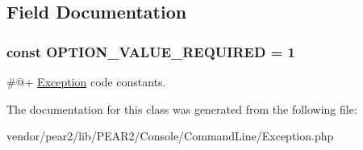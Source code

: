 \subsection{\-Field \-Documentation}
\hypertarget{class_p_e_a_r2_1_1_console_1_1_command_line_1_1_exception_a6c8de7ca8e71c28392907f2b23d6ed76}{
\subsubsection[{\-O\-P\-T\-I\-O\-N\-\_\-\-V\-A\-L\-U\-E\-\_\-\-R\-E\-Q\-U\-I\-R\-E\-D}]{\setlength{\rightskip}{0pt plus 5cm}const \-O\-P\-T\-I\-O\-N\-\_\-\-V\-A\-L\-U\-E\-\_\-\-R\-E\-Q\-U\-I\-R\-E\-D = 1}}
\label{class_p_e_a_r2_1_1_console_1_1_command_line_1_1_exception_a6c8de7ca8e71c28392907f2b23d6ed76}
\#@+ \hyperlink{class_p_e_a_r2_1_1_console_1_1_command_line_1_1_exception}{\-Exception} code constants. 

\-The documentation for this class was generated from the following file\-:\begin{DoxyCompactItemize}
\item 
vendor/pear2/lib/\-P\-E\-A\-R2/\-Console/\-Command\-Line/\-Exception.\-php\end{DoxyCompactItemize}
